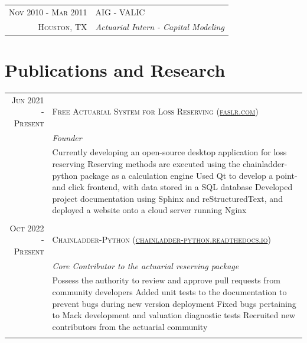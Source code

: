 \documentclass[10pt]{article} %
\begin{document}
\begin{tabular}{r|p{12cm}}
\textsc{Nov 2010 - Mar 2011} & \textsc{AIG - VALIC}\\
\textsc{Houston, TX} & \emph{Actuarial Intern - Capital Modeling}\\
\end{tabular}


\section{Publications and Research}
\begin{tabular}{r|p{12cm}}
\textsc{Jun 2021 - Present} & \textsc{Free Actuarial System for Loss Reserving (\href{https://faslr.com}{faslr.com})}\\
\textsc{} & \emph{Founder}\\
& \footnotesize{
	\textbullet Currently developing an open-source desktop application for loss reserving\newline
	\textbullet Reserving methods are executed using the chainladder-python package as a calculation engine\newline
	\textbullet Used Qt to develop a point-and click frontend, with data stored in a SQL database\newline
	\textbullet Developed project documentation using Sphinx and reStructuredText, and deployed a website onto a cloud server running Nginx
}\\
\multicolumn{2}{c}{} \\


\textsc{Oct 2022 - Present} & \textsc{Chainladder-Python (\href{https://chainladder-python.readthedocs.io}{chainladder-python.readthedocs.io})}\\
\textsc{} & \emph{Core Contributor to the actuarial reserving package}\\
& \footnotesize{
	\textbullet Possess the authority to review and approve pull requests from community developers\newline
	\textbullet Added unit tests to the documentation to prevent bugs during new version deployment\newline
	\textbullet Fixed bugs pertaining to Mack development and valuation diagnostic tests\newline
	\textbullet Recruited new contributors from the actuarial community\newline
}\\
\multicolumn{2}{c}{} \\


\end{tabular}
\end{document}

